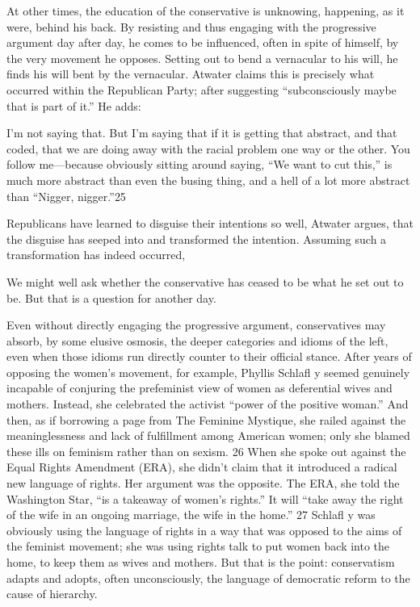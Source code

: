  \par 
At other times, the education of the conservative is unknowing, happening, as it were, behind his back. By resisting and thus engaging with the progressive argument day after day, he comes to be influenced, often in spite of himself, by the very movement he opposes. Setting out to bend a vernacular to his will, he finds his will bent by the vernacular. Atwater claims this is precisely what occurred within the Republican Party; after suggesting “subconsciously maybe that is part of it.” He adds:
 \par 
I’m not saying that. But I’m saying that if it is getting that abstract, and that coded, that we are doing away with the racial problem one way or the other. You follow me—because obviously sitting around saying, “We want to cut this,” is much more abstract than even the busing thing, and a hell of a lot more abstract than “Nigger, nigger.”{\color{blue}25}
 \par 
Republicans have learned to disguise their intentions so well, Atwater argues, that the disguise has seeped into and transformed the intention. Assuming such a transformation has indeed occurred,
 \par 
We might well ask whether the conservative has ceased to be what he set out to be. But that is a question for another day.
 \par 
Even without directly engaging the progressive argument, conservatives may absorb, by some elusive osmosis, the deeper categories and idioms of the left, even when those idioms run directly counter to their official stance. After years of opposing the women’s movement, for example, Phyllis Schlafl y seemed genuinely incapable of conjuring the prefeminist view of women as deferential wives and mothers. Instead, she celebrated the activist “power of the positive woman.” And then, as if borrowing a page from The Feminine Mystique, she railed against the meaninglessness and lack of fulfillment among American women; only she blamed these ills on feminism rather than on sexism. {\color{blue}26} When she spoke out against the Equal Rights Amendment (ERA), she didn’t claim that it introduced a radical new language of rights. Her argument was the opposite. The ERA, she told the Washington Star, “is a takeaway of women’s rights.” It will “take away the right of the wife in an ongoing marriage, the wife in the home.” {\color{blue}27} Schlafl y was obviously using the language of rights in a way that was opposed to the aims of the feminist movement; she was using rights talk to put women back into the home, to keep them as wives and mothers. But that is the point: conservatism adapts and adopts, often unconsciously, the language of democratic reform to the cause of hierarchy.
